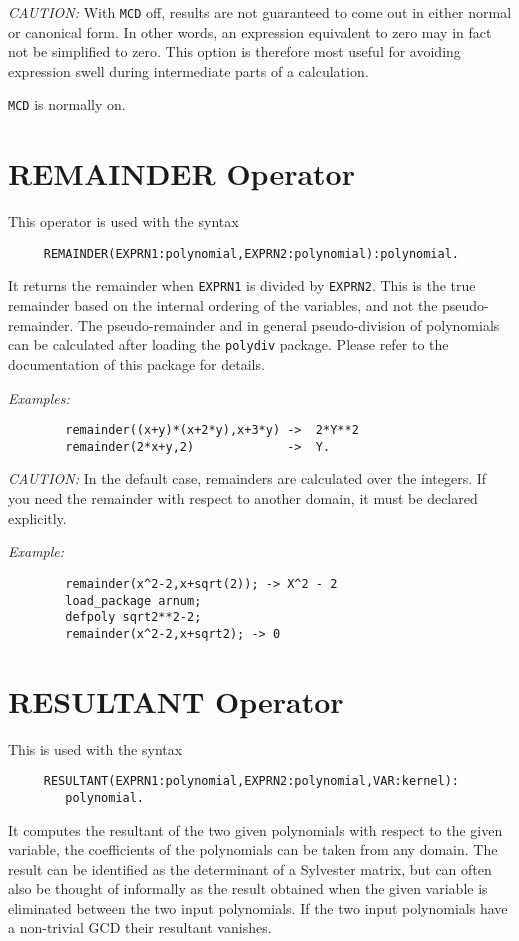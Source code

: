 {\it CAUTION:}  With {\tt MCD} off, results are not guaranteed to come out in
either normal or canonical form.  In other words, an expression equivalent
to zero may in fact not be simplified to zero.  This option is therefore
most useful for avoiding expression swell during intermediate parts of a
calculation.

{\tt MCD} is normally on.

\section{REMAINDER Operator}
\hypertarget{operator:REMAINDER}{}

This operator is used with the syntax
\begin{verbatim}
     REMAINDER(EXPRN1:polynomial,EXPRN2:polynomial):polynomial.
\end{verbatim}
It returns the remainder when {\tt EXPRN1} is divided by {\tt EXPRN2}.  This
is the true remainder based on the internal ordering of the variables, and
not the pseudo-remainder. The pseudo-remainder 
and in general pseudo-division  of polynomials
can be calculated after loading  the {\tt polydiv} package.
Please refer to the documentation of this package for details.

{\it Examples:}
\begin{verbatim}
        remainder((x+y)*(x+2*y),x+3*y) ->  2*Y**2
        remainder(2*x+y,2)             ->  Y.
\end{verbatim}

{\it CAUTION:} In the default case, remainders are calculated over the
integers.  If you need the remainder with respect to another domain, it
must be declared explicitly.

{\it Example:}
\begin{verbatim}
        remainder(x^2-2,x+sqrt(2)); -> X^2 - 2
        load_package arnum;
        defpoly sqrt2**2-2;
        remainder(x^2-2,x+sqrt2); -> 0
\end{verbatim}

\section{RESULTANT Operator}
\hypertarget{operator:RESULTANT}{}
\hypertarget{switch:BEZOUT}{}

This is used with the syntax
\begin{verbatim}
     RESULTANT(EXPRN1:polynomial,EXPRN2:polynomial,VAR:kernel):
        polynomial.
\end{verbatim}
It computes the resultant of the two given polynomials with respect to the
given variable, the coefficients of the polynomials can be taken from any
domain. The result can be identified as the determinant of a
Sylvester matrix, but can often also be thought of informally as the
result obtained when the given variable is eliminated between the two input
polynomials. If the two input polynomials have a non-trivial GCD their
resultant vanishes.

